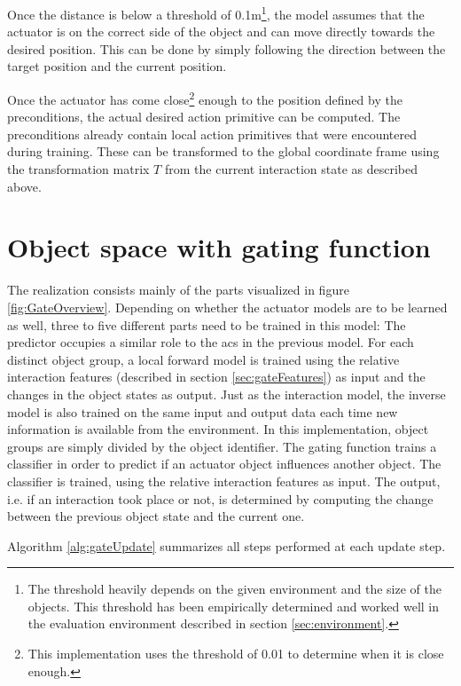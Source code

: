 Once the distance is below a threshold of 0.1m\footnote{The threshold heavily depends on the given environment and the size of the objects. This threshold has been empirically determined and worked well in the evaluation environment described in section \ref{sec:environment}.}, the model assumes that the actuator is on the correct side of the object and can move directly towards the desired position. This can be done by simply following the direction between the target position and the current position.

Once the actuator has come close\footnote{This implementation uses the threshold of 0.01 to determine when it is close enough.} enough to the position defined by the preconditions, the actual desired action primitive can be computed. The preconditions already contain local action primitives that were encountered during training. These can be transformed to the global coordinate frame using the transformation matrix $T$ from the current interaction state as described above. 


\section{Object space with gating function \label{sec:gateRealization}}

The realization consists mainly of the parts visualized in figure \ref{fig:GateOverview}. 
Depending on whether the actuator models are to be learned as well, three to five different parts need to be trained in this model: The predictor occupies a similar role to the \glspl{ac} in the previous model. For each distinct object group, a local forward model is trained using the relative interaction features (described in section \ref{sec:gateFeatures}) as input and the changes in the object states as output. Just as the interaction model, the inverse model is also trained on the same input and output data each time new information is available from the environment. 
In this implementation, object groups are simply divided by the object identifier. 
The gating function trains a classifier in order to predict if an actuator object influences another object. The classifier is trained, using the relative interaction features as input. The output, i.e. if an interaction took place or not, is determined by computing the change between the previous object state and the current one.

Algorithm \ref{alg:gateUpdate} summarizes all steps performed at each update step.


